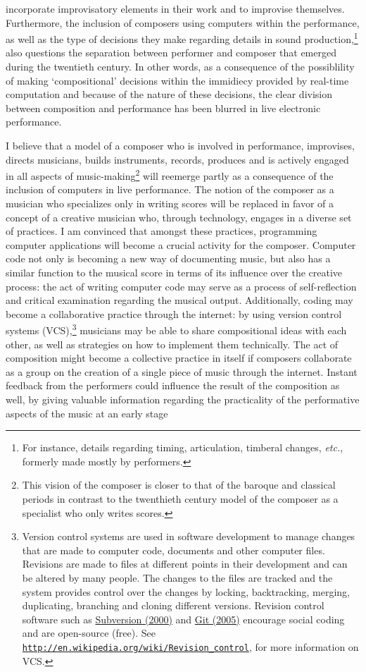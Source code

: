 incorporate improvisatory elements in their work and to improvise themselves. Furthermore, the inclusion of composers using computers within the performance, as well as the type of decisions they make regarding details in sound production,\footnote{For instance, details regarding timing, articulation, timberal changes, \emph{etc.}, formerly made mostly by performers.} also questions the separation between performer and composer that emerged during the twentieth century. In other words, as a consequence of the possiblility of making `compositional' decisions within the immidiecy provided by real-time computation and because of the nature of these decisions, the clear division between composition and performance has been blurred in live electronic performance. 

I believe that a model of a composer who is involved in performance, improvises, directs musicians, builds instruments, records, produces and is actively engaged in all aspects of music-making\footnote{This vision of the composer is closer to that of the baroque and classical periods in contrast to the twenthieth century model of the composer as a specialist who only writes scores.} will reemerge partly as a consequence of the inclusion of computers in live performance. The notion of the composer as a musician who specializes only in writing scores will be replaced in favor of a concept of a creative musician who, through technology, engages in a diverse set of practices. I am convinced that amongst these practices, programming computer applications will become a crucial activity for the composer. Computer code not only is becoming a new way of documenting music, but also has a similar function to the musical score in terms of its influence over the creative process: the act of writing computer code may serve as a process of self-reflection and critical examination regarding the musical output. Additionally, coding may become a collaborative practice through the internet: by using version control systems (VCS),\footnote{Version control systems are used in software development to manage changes that are made to computer code, documents and other computer files. Revisions are made to files at different points in their development and can be altered by many people. The changes to the files are tracked and the system provides control over the changes by locking, backtracking, merging, duplicating, branching and cloning different versions. Revision control software such as \href{http://subversion.tigris.org/}{Subversion (2000)} and \href{http://git-scm.com/}{Git (2005)} encourage social coding and are open-source (free). See \href{http://en.wikipedia.org/wiki/Revision_control} {\texttt{http://en.wikipedia.org/wiki/Revision\_control}}, for more information on VCS.} musicians may be able to share compositional ideas with each other, as well as strategies on how to implement them technically. The act of composition might become a collective practice in itself if composers collaborate as a group on the creation of a single piece of music through the internet. Instant feedback from the performers could influence the result of the composition as well, by giving valuable information regarding the practicality of the performative aspects of the music at an early stage 